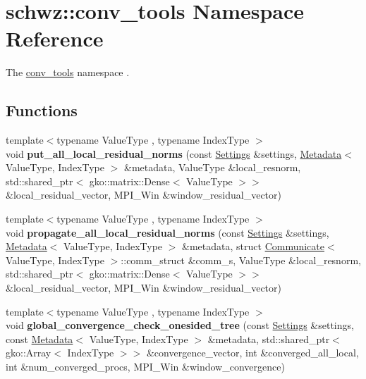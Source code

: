 \hypertarget{namespaceschwz_1_1conv__tools}{}\section{schwz\+:\+:conv\+\_\+tools Namespace Reference}
\label{namespaceschwz_1_1conv__tools}


The \hyperlink{namespaceschwz_1_1conv__tools}{conv\+\_\+tools} namespace .  


\subsection*{Functions}
\begin{DoxyCompactItemize}
\item 
\mbox{\label{namespaceschwz_1_1conv__tools_a36a12a05164af19e0faec5403fd3cfce}} 
{\footnotesize template$<$typename Value\+Type , typename Index\+Type $>$ }\\void {\bfseries put\+\_\+all\+\_\+local\+\_\+residual\+\_\+norms} (const \hyperlink{structschwz_1_1Settings}{Settings} \&settings, \hyperlink{structschwz_1_1Metadata}{Metadata}$<$ Value\+Type, Index\+Type $>$ \&metadata, Value\+Type \&local\+\_\+resnorm, std\+::shared\+\_\+ptr$<$ gko\+::matrix\+::\+Dense$<$ Value\+Type $>$$>$ \&local\+\_\+residual\+\_\+vector, M\+P\+I\+\_\+\+Win \&window\+\_\+residual\+\_\+vector)
\item 
\mbox{\label{namespaceschwz_1_1conv__tools_a8e33cee5af118a993c675464124aa6d6}} 
{\footnotesize template$<$typename Value\+Type , typename Index\+Type $>$ }\\void {\bfseries propagate\+\_\+all\+\_\+local\+\_\+residual\+\_\+norms} (const \hyperlink{structschwz_1_1Settings}{Settings} \&settings, \hyperlink{structschwz_1_1Metadata}{Metadata}$<$ Value\+Type, Index\+Type $>$ \&metadata, struct \hyperlink{classschwz_1_1Communicate}{Communicate}$<$ Value\+Type, Index\+Type $>$\+::comm\+\_\+struct \&comm\+\_\+s, Value\+Type \&local\+\_\+resnorm, std\+::shared\+\_\+ptr$<$ gko\+::matrix\+::\+Dense$<$ Value\+Type $>$$>$ \&local\+\_\+residual\+\_\+vector, M\+P\+I\+\_\+\+Win \&window\+\_\+residual\+\_\+vector)
\item 
\mbox{\label{namespaceschwz_1_1conv__tools_ad2a454563a99665373863676ab9c0a72}} 
{\footnotesize template$<$typename Value\+Type , typename Index\+Type $>$ }\\void {\bfseries global\+\_\+convergence\+\_\+check\+\_\+onesided\+\_\+tree} (const \hyperlink{structschwz_1_1Settings}{Settings} \&settings, const \hyperlink{structschwz_1_1Metadata}{Metadata}$<$ Value\+Type, Index\+Type $>$ \&metadata, std\+::shared\+\_\+ptr$<$ gko\+::\+Array$<$ Index\+Type $>$$>$ \&convergence\+\_\+vector, int \&converged\+\_\+all\+\_\+local, int \&num\+\_\+converged\+\_\+procs, M\+P\+I\+\_\+\+Win \&window\+\_\+convergence)
$$
\end{DoxyCompactItemize}
